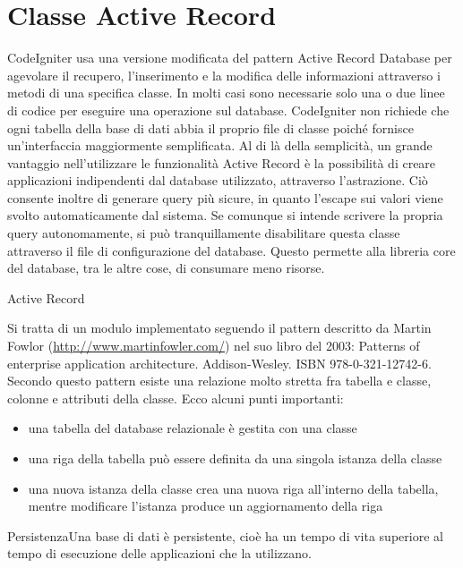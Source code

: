 \section{Classe Active Record}
\label{class:activerecord}

CodeIgniter usa una versione modificata del pattern Active Record Database per agevolare il recupero, l'inserimento e la modifica delle informazioni attraverso i metodi di una specifica classe. In molti casi sono necessarie solo una o due linee di codice per eseguire una operazione sul database. CodeIgniter non richiede che ogni tabella della base di dati abbia il proprio file di classe poiché fornisce un'interfaccia maggiormente semplificata. Al di là della semplicità, un grande vantaggio nell'utilizzare le funzionalità Active Record è la possibilità di creare applicazioni indipendenti dal database utilizzato, attraverso l'astrazione. Ciò consente inoltre di generare query più sicure, in quanto l'escape sui valori viene svolto automaticamente dal sistema. Se comunque si intende scrivere la propria query autonomamente, si può tranquillamente disabilitare questa classe attraverso il file di configurazione del database. Questo permette alla libreria core del database, tra le altre cose, di consumare meno risorse.

\begin{deftabv}{Active Record}{Si tratta di un modulo implementato seguendo il pattern descritto da Martin Fowlor (\url{http://www.martinfowler.com/}) nel suo libro del 2003: Patterns of enterprise application architecture. Addison-Wesley. ISBN 978-0-321-12742-6. Secondo questo pattern esiste una relazione molto stretta fra tabella e classe, colonne e attributi della classe. Ecco alcuni punti importanti:
\begin{itemize}
\normalsize

\item una tabella del database relazionale è gestita con una classe
\item una riga della tabella può essere definita da una singola istanza della classe
\item una nuova istanza della classe crea una nuova riga all'interno della tabella, mentre modificare l'istanza produce un aggiornamento della riga
\end{itemize}
}
\end{deftabv}
\normalsize

\begin{deftabv}{Persistenza}{Una base di dati è persistente, cioè ha un tempo di vita superiore al tempo di esecuzione delle applicazioni che la utilizzano.}
\end{deftabv}
\normalsize

